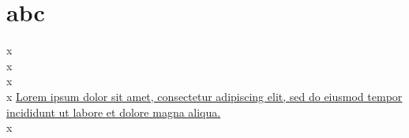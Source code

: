 \documentclass{article}
\begin{document}
\section{abc}
x\\x\\x\\x
\href{https://www.latex-project.org}{Lorem ipsum dolor sit amet, consectetur adipiscing elit, sed do eiusmod tempor incididunt ut labore et dolore magna aliqua.}\\x
\end{document}
